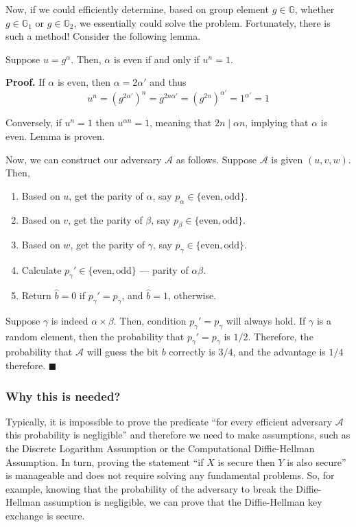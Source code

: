 \documentclass[../lecture-notes.tex]{subfiles}
\begin{document}
Now, if we could efficiently determine, based on group element $g \in \mathbb{G}$, whether $g \in \mathbb{G}_1$ or $g \in \mathbb{G}_2$, we essentially could solve the problem. Fortunately, there is such a method! Consider the following lemma.

\begin{lemma}
    Suppose $u=g^{\alpha}$. Then, $\alpha$ is even if and only if $u^n = 1$.
\end{lemma}

\textbf{Proof.} If $\alpha$ is even, then $\alpha = 2\alpha'$ and thus
\begin{equation}
    u^n = (g^{2\alpha'})^n = g^{2n\alpha'} = (g^{2n})^{\alpha'} = 1^{\alpha'} = 1
\end{equation}

Conversely, if $u^n = 1$ then $u^{\alpha n}=1$, meaning that $2n \mid \alpha n$, implying that $\alpha$ is even. Lemma is proven.

Now, we can construct our adversary $\mathcal{A}$ as follows. Suppose $\mathcal{A}$ is given $(u,v,w)$. Then,
\begin{enumerate}
    \item Based on $u$, get the parity of $\alpha$, say $p_{\alpha} \in \{\text{even}, \text{odd}\}$.
    \item Based on $v$, get the parity of $\beta$, say $p_{\beta} \in \{\text{even}, \text{odd}\}$.
    \item Based on $w$, get the parity of $\gamma$, say $p_{\gamma} \in \{\text{even}, \text{odd}\}$.
    \item Calculate $p_{\gamma}'\in \{\text{even}, \text{odd}\}$ --- parity of $\alpha\beta$.
    \item Return $\hat{b}=0$ if $p_{\gamma}' = p_{\gamma}$, and $\hat{b}=1$, otherwise.
\end{enumerate}

Suppose $\gamma$ is indeed $\alpha \times \beta$. Then, condition $p_{\gamma}'=p_{\gamma}$ will always hold. If $\gamma$ is a random element, then the probability that $p_{\gamma}'=p_{\gamma}$ is $1/2$. Therefore, the probability that $\mathcal{A}$ will guess the bit $b$ correctly is $3/4$, and the advantage is $1/4$ therefore. $\blacksquare$

\subsubsection{Why this is needed?}

Typically, it is impossible to prove the predicate ``for every efficient adversary $\mathcal{A}$ this probability is negligible'' and therefore we need to make assumptions, such as the Discrete Logarithm Assumption or the Computational Diffie-Hellman Assumption. In turn, proving the statement ``if $X$ is secure then $Y$ is also secure'' is manageable and does not require solving any fundamental problems. So, for example,
knowing that the probability of the adversary to break the Diffie-Hellman assumption is negligible, we can prove that the Diffie-Hellman key exchange is secure. 
\end{document}
